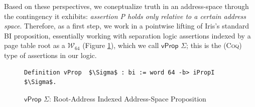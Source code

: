 Based on these perspectives, we coneptualize truth in an address-space through the contingency it exhibits: 
\textit{assertion P holds only relative to a certain address space}. 
Therefore, as a first step, we work in a pointwise lifting of Iris's standard BI proposition,
essentially working with separation logic assertions indexed by a page table root as a $\mathcal{W}_{64}$
(Figure \ref{fig:vprop}), which we call $\textsf{vProp }\Sigma$; this is the (\textsc{Coq}) type of assertions in our logic.
\begin{figure}[t]
\begin{lstlisting}[language=Coq]
  Definition vProp  $\Sigma$ : bi := word 64 -b> iPropI  $\Sigma$.
  \end{lstlisting}
\caption{$\textsf{vProp }\Sigma$: Root-Address Indexed Address-Space Proposition}
  \label{fig:vprop}
\end{figure}

